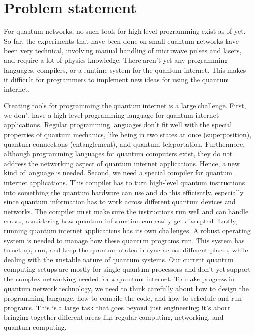 
\section{Problem statement}
For quantum networks, no such tools for high-level programming exist as of yet.
So far, the experiments that have been done on small quantum networks have been very technical, involving manual handling of microwave pulses and lasers, and require a lot of physics knowledge.
There aren't yet any programming languages, compilers, or a runtime system for the quantum internet.
This makes it difficult for programmers to implement new ideas for using the quantum internet.

Creating tools for programming the quantum internet is a large challenge.
First, we don't have a high-level programming language for quantum internet applications.
Regular programming languages don't fit well with the special properties of quantum mechanics, like being in two states at once (superposition), quantum connections (entanglement), and quantum teleportation. Furthermore, although programming languages for quantum computers exist, they do not address the networking aspect of quantum internet applications.
Hence, a new kind of language is needed.
Second, we need a special compiler for quantum internet applications.
This compiler has to turn high-level quantum instructions into something the quantum hardware can use and do this efficiently, especially since quantum information has to work across different quantum devices and networks.
The compiler must make sure the instructions run well and can handle errors, considering how quantum information can easily get disrupted.
Lastly, running quantum internet applications has its own challenges.
A robust operating system is needed to manage how these quantum programs run.
This system has to set up, run, and keep the quantum states in sync across different places, while dealing with the unstable nature of quantum systems.
Our current quantum computing setups are mostly for single quantum processors and don't yet support the complex networking needed for a quantum internet.
To make progress in quantum network technology, we need to think carefully about how to design the programming language, how to compile the code, and how to schedule and run programs.
This is a large task that goes beyond just engineering; it's about bringing together different areas like regular computing, networking, and quantum computing.




